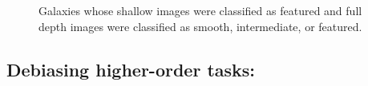 \documentclass[twocolumn]{aastex6}
\begin{document}
\begin{figure}
\centering





\caption{Galaxies whose shallow images were classified as featured and full
depth images were classified as smooth, intermediate, or featured.}
\label{fig:shallow_featured}
\end{figure}

\subsection{Debiasing higher-order tasks: \fbar}
\label{sec:ferengi_bar}
\end{document}
